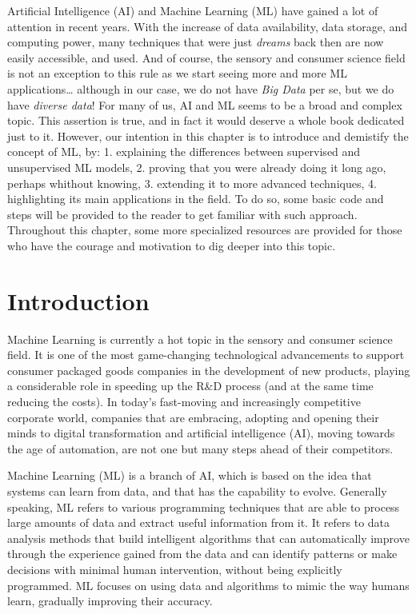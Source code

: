\documentclass[
]{krantz}
\renewenvironment{quote}{\begin{VF}}{\end{VF}}
\begin{document}
\begin{quote}
Artificial Intelligence (AI) and Machine Learning (ML) have gained a lot of attention in recent years. With the increase of data availability, data storage, and computing power, many techniques that were just \emph{dreams} back then are now easily accessible, and used. And of course, the sensory and consumer science field is not an exception to this rule as we start seeing more and more ML applications\ldots{} although in our case, we do not have \emph{Big Data} per se, but we do have \emph{diverse data}!
For many of us, AI and ML seems to be a broad and complex topic. This assertion is true, and in fact it would deserve a whole book dedicated just to it. However, our intention in this chapter is to introduce and demistify the concept of ML, by:
1. explaining the differences between supervised and unsupervised ML models,
2. proving that you were already doing it long ago, perhaps whithout knowing,
3. extending it to more advanced techniques,
4. highlighting its main applications in the field.
To do so, some basic code and steps will be provided to the reader to get familiar with such approach. Throughout this chapter, some more specialized resources are provided for those who have the courage and motivation to dig deeper into this topic.
\end{quote}

\hypertarget{introduction-2}{%
\section{Introduction}\label{introduction-2}}

Machine Learning is currently a hot topic in the sensory and consumer science field. It is one of the most game-changing technological advancements to support consumer packaged goods companies in the development of new products, playing a considerable role in speeding up the R\&D process (and at the same time reducing the costs). In today's fast-moving and increasingly competitive corporate world, companies that are embracing, adopting and opening their minds to digital transformation and artificial intelligence (AI), moving towards the age of automation, are not one but many steps ahead of their competitors.

Machine Learning (ML) is a branch of AI, which is based on the idea that systems can learn from data, and that has the capability to evolve. Generally speaking, ML refers to various programming techniques that are able to process large amounts of data and extract useful information from it. It refers to data analysis methods that build intelligent algorithms that can automatically improve through the experience gained from the data and can identify patterns or make decisions with minimal human intervention, without being explicitly programmed. ML focuses on using data and algorithms to mimic the way humans learn, gradually improving their accuracy.
\end{document}
